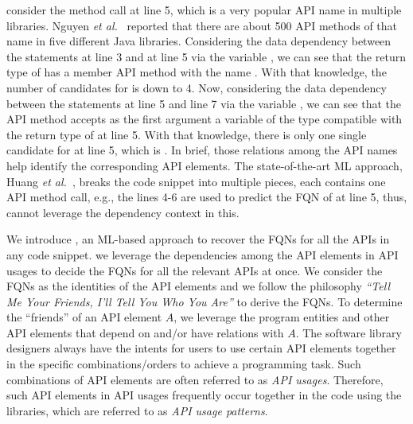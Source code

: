 consider the method call  at line 5, which is a very
popular API name in multiple libraries. Nguyen {\em et
  al.}~\cite{icse18} reported that there are about 500 API methods of
that name in five different Java libraries. Considering the data
dependency between the statements at line 3 and at line 5 via the
variable , we can see that the return type of
 has a member API method with the name .
With that knowledge, the number of candidates for  is
down to 4. Now, considering the data dependency between the statements
at line 5 and line 7 via the variable , we can see that the
API method  accepts as the first argument a
variable of the type compatible with the return type of 
at line 5. With that knowledge, there is only one single candidate for
 at line 5, which is
.
In brief, those relations among the API names help identify the
corresponding API elements. The state-of-the-art ML approach, Huang
{\em et al.}~\cite{prompt-ase22}, breaks the code snippet into
multiple pieces, each contains one API method call, e.g., the lines
4-6 are used to predict the FQN of  at line 5, thus,
cannot leverage the dependency context in this.

We introduce {\tool}, an ML-based approach to recover the FQNs for all
the APIs in any code snippet.
we leverage the dependencies among the API elements in
API usages to decide the FQNs for all the relevant APIs at once. We
consider the FQNs as the identities of the API elements and we follow
the philosophy {\em ``Tell Me Your Friends, I'll Tell You Who You
  Are''} to derive the FQNs. To determine the ``friends'' of an API
element $A$, we leverage the program entities and other API elements
that depend on and/or have relations with $A$. The software library
designers always have the intents for users to use certain API
elements together in the specific combinations/orders to achieve a
programming task. Such combinations of API elements are often referred
to as {\em API usages}. Therefore, such API elements in API usages
frequently occur together in the code using the libraries, which are
referred to as {\em API usage patterns}.

